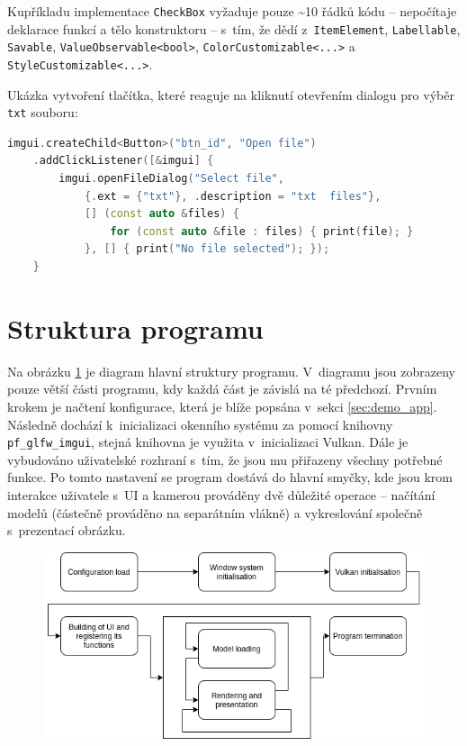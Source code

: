 Kupříkladu implementace \texttt{CheckBox} vyžaduje pouze \textasciitilde10 řádků kódu -- nepočítaje deklarace funkcí a tělo konstruktoru -- s~tím, že dědí z~\texttt{ItemElement}, \texttt{Labellable}, \texttt{Savable}, \texttt{ValueObservable<bool>}, \texttt{ColorCustomizable<...>} a \texttt{StyleCustomizable<...>}.

Ukázka vytvoření tlačítka, které reaguje na kliknutí otevřením dialogu pro výběr \texttt{txt} souboru:

\begin{lstlisting}[language=C++, caption={Vytvoření tlačítka pro výběr souboru}]
imgui.createChild<Button>("btn_id", "Open file")
    .addClickListener([&imgui] {
        imgui.openFileDialog("Select file", 
            {.ext = {"txt"}, .description = "txt  files"}, 
            [] (const auto &files) {
                for (const auto &file : files) { print(file); }
            }, [] { print("No file selected"); });
    }
\end{lstlisting}

\section{Struktura programu}
Na obrázku \ref{fig:program_flow} je diagram hlavní struktury programu. V~diagramu jsou zobrazeny pouze větší části programu, kdy každá část je závislá na té předchozí. Prvním krokem je načtení konfigurace, která je blíže popsána v~sekci \ref{sec:demo_app}. Následně dochází k~inicializaci okenního systému za pomocí knihovny \texttt{pf\_glfw\_imgui}, stejná knihovna je využita v~inicializaci Vulkan. Dále je vybudováno uživatelské rozhraní s~tím, že jsou mu přiřazeny všechny potřebné funkce. Po tomto nastavení se program dostává do hlavní smyčky, kde jsou krom interakce uživatele s~UI a kamerou prováděny dvě důležité operace -- načítání modelů (částečně prováděno na separátním vlákně) a vykreslování společně s~prezentací obrázku.

\begin{figure}[H]
	\centering
	\includegraphics[scale=0.7]{images/program_flow.png}
	\captionsetup{justification=centering}
	\label{fig:program_flow}
\end{figure}

